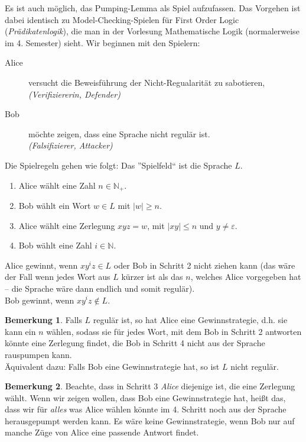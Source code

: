 \documentclass[11pt, a4paper]{article}
\theoremstyle{definition}
\newtheorem*{remark*}{Bemerkung}
\theoremstyle{plain}
\numberwithin{equation}{section}
\begin{document}
Es ist auch möglich, das Pumping-Lemma als Spiel aufzufassen. Das Vorgehen ist dabei identisch zu Model-Checking-Spielen für First Order Logic (\textit{Prädikatenlogik}), die man in der Vorlesung Mathematische Logik (normalerweise im 4. Semester) sieht. Wir beginnen mit den Spielern:
\begin{description}
	\item[Alice] versucht die Beweisführung der Nicht-Regualarität zu sabotieren,\\
		\textit{(Verifiziererin, Defender)}
	\item[Bob] möchte zeigen, dass eine Sprache nicht regulär ist.\\
		\textit{(Falsifizierer, Attacker)}
\end{description}
Die Spielregeln gehen wie folgt: Das ''Spielfeld`` ist die Sprache $L$.
\begin{enumerate}[label=\arabic*)]
	\item Alice wählt eine Zahl $n \in \mathbb{N}_+$.
	\item Bob wählt ein Wort $w \in L$ mit $|w| \geq n$.
	\item Alice wählt eine Zerlegung $xyz = w$, mit $|xy| \leq n$ und $y \neq \varepsilon$.
	\item Bob wählt eine Zahl $i \in \mathbb{N}$.
\end{enumerate}
Alice gewinnt, wenn $xy^iz \in L$ oder Bob in Schritt 2 nicht ziehen kann (das wäre der Fall wenn jedes Wort aus $L$ kürzer ist als das $n$, welches Alice vorgegeben hat -- die Sprache wäre dann endlich und somit regulär).\\
Bob gewinnt, wenn $xy^iz \notin L$.
\begin{remark*}
	Falls $L$ regulär ist, so hat Alice eine Gewinnstrategie, d.h. sie kann ein $n$ wählen, sodass sie für jedes Wort, mit dem Bob in Schritt 2 antworten könnte eine Zerlegung findet, die Bob in Schritt 4 nicht aus der Sprache rauspumpen kann.\\
	Äquivalent dazu: Falls Bob eine Gewinnstrategie hat, so ist $L$ nicht regulär.
\end{remark*}
\begin{remark*}
	Beachte, dass in Schritt 3 \textit{Alice} diejenige ist, die eine Zerlegung wählt. Wenn wir zeigen wollen, dass Bob eine Gewinnstrategie hat, heißt das, dass wir für \textit{alles} was Alice wählen könnte im 4. Schritt noch aus der Sprache herausgepumpt werden kann. Es wäre keine Gewinnstrategie, wenn Bob nur auf manche Züge von Alice eine passende Antwort findet.
\end{remark*}
\end{document}
